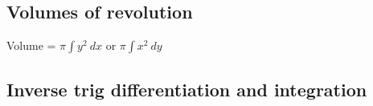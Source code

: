 \subsection{Volumes of revolution}
Volume = $\pi\int y^2 \: dx$ or $\pi\int x^2 \: dy$

\subsection{Inverse trig differentiation and integration}
